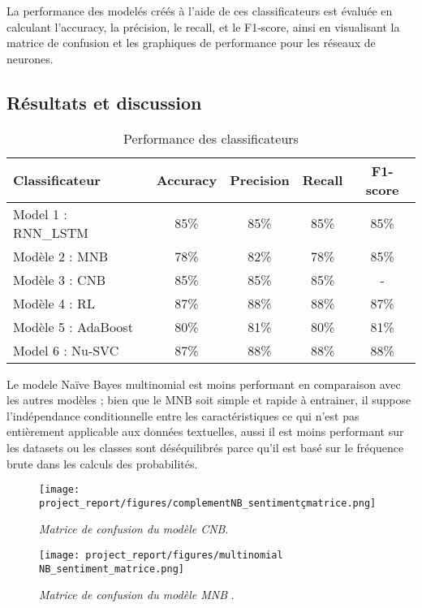 La performance des modelés créés à l’aide de ces classificateurs est évaluée en calculant l’accuracy, la précision, le recall, et le F1-score, ainsi en visualisant la matrice de confusion et les graphiques de performance pour les réseaux de neurones.   

\subsection{Résultats et discussion }
\begin{table}[h!]
    \centering
    \begin{tabular}{lcccc}
        \toprule
        \textbf{Classificateur} & \textbf{Accuracy} & \textbf{Precision} & \textbf{Recall} & \textbf{F1-score} \\
        \midrule
        Model 1 : RNN\_LSTM & 85\% & 85\% & 85\% & 85\% \\
        Modèle 2 : MNB & 78\% & 82\% & 78\% & 85\% \\
        Modèle 3 : CNB & 85\% & 85\% & 85\% & - \\
        Modèle 4 : RL & 87\% & 88\% & 88\% & 87\% \\
        Modèle 5 : AdaBoost & 80\% & 81\% & 80\% & 81\% \\
        Model 6 : Nu-SVC & 87\% & 88\% & 88\% & 88\% \\
        \bottomrule
    \end{tabular}
    \caption{Performance des classificateurs}
    \label{tab:classifier_performance}
\end{table}

Le modele Naïve Bayes multinomial est moins performant en comparaison avec les autres modèles ; bien que le MNB soit simple et rapide à entrainer, il suppose l’indépendance conditionnelle entre les caractéristiques ce qui n’est pas entièrement applicable aux données textuelles, aussi il est moins performant sur les datasets ou les classes sont déséquilibrés parce qu’il est basé sur le fréquence brute dans les calculs des probabilités. \par
\begin{figure}[h]
    \centering
    \begin{minipage}{0.45\textwidth}
        \centering
        \texttt{[image: project\_report/figures/complementNB\_sentimentçmatrice.png]}
        \caption{\textit{Matrice de confusion du modèle CNB}.}
        \label{fig:figureSHJJJR}
    \end{minipage}\hfill
    \begin{minipage}{0.45\textwidth}
        \centering
        \texttt{[image: project\_report/figures/multinomial NB\_sentiment\_matrice.png]}
        \caption{\textit{Matrice de confusion du modèle MNB }.}
        \label{fig:figureNBVV}
    \end{minipage}
\end{figure} 


